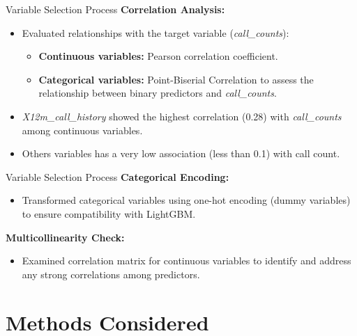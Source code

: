 \documentclass{beamer}\usepackage[]{graphicx}\usepackage[]{xcolor}
\begin{document}
\begin{frame}{Variable Selection Process}
\textbf{Correlation Analysis:}
\begin{itemize}
    \item Evaluated relationships with the target variable (\textit{call\_counts}):
    \begin{itemize}
        \item \textbf{Continuous variables:} Pearson correlation coefficient.
        \item \textbf{Categorical variables:} Point-Biserial Correlation to assess the relationship between binary predictors and           \textit{call\_counts}.
    \end{itemize}
    
    \item \textit{X12m\_call\_history} showed the highest correlation (0.28) with \textit{call\_counts} among continuous variables.
    \item Others variables has a very low association (less than 0.1) with call count.
\end{itemize}

\end{frame}

\begin{frame}{Variable Selection Process}
\textbf{Categorical Encoding:}
\begin{itemize}
    \item Transformed categorical variables using one-hot encoding (dummy variables) to ensure compatibility with LightGBM.
\end{itemize}

\textbf{Multicollinearity Check:}
\begin{itemize}
    \item Examined correlation matrix for continuous variables to identify and address any strong correlations among predictors.
\end{itemize}
\end{frame}


\section{Methods Considered}
\end{document}
